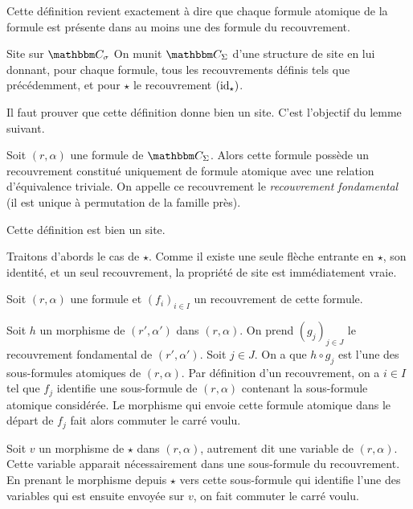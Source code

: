 Cette définition revient exactement à dire que chaque formule atomique de la formule est
présente dans au moins une des formule du recouvrement.

\begin{defi}{Site sur $\C_\sigma$}
    On munit $\C_\Sigma$ d'une structure de site en lui donnant, pour chaque formule,
    tous les recouvrements définis tels que précédemment, et pour $\star$ le recouvrement
    $(\operatorname{id}_\star)$.
\end{defi}

Il faut prouver que cette définition donne bien un site. C'est l'objectif du
lemme suivant.

\begin{rem}
    Soit $(r,\alpha)$ une formule de $\C_\Sigma$. Alors cette formule possède un
    recouvrement constitué uniquement de formule atomique avec une relation d'équivalence
    triviale. On appelle ce recouvrement le \emph{recouvrement fondamental}
    (il est unique à permutation de la famille près).
\end{rem}

\begin{lem}
    Cette définition est bien un site.
\end{lem}

\begin{pv}
    Traitons d'abords le cas de $\star$. Comme il existe une seule flèche
    entrante en $\star$, son identité, et un seul recouvrement, la propriété de
    site est immédiatement vraie.

    Soit $(r,\alpha)$ une formule et $(f_i)_{i\in I}$ un recouvrement de cette formule.
    
    Soit $h$ un morphisme de $(r', \alpha')$ dans $(r,\alpha)$. On prend
    $(g_j)_{j\in J}$ le recouvrement fondamental de $(r', \alpha')$. Soit $j\in
    J$. On a que $h\circ g_j$ est l'une des sous-formules atomiques de
    $(r,\alpha)$. Par définition d'un recouvrement, on a $i\in I$ tel que $f_j$
    identifie une sous-formule de $(r,\alpha)$ contenant la sous-formule
    atomique considérée. Le morphisme qui envoie cette formule atomique dans le
    départ de $f_j$ fait alors commuter le carré voulu.

    Soit $v$ un morphisme de $\star$ dans $(r,\alpha)$, autrement dit une
    variable de $(r,\alpha)$.  Cette variable apparait nécessairement dans une
    sous-formule du recouvrement. En prenant le morphisme depuis $\star$ vers
    cette sous-formule qui identifie l'une des variables qui est ensuite
    envoyée sur $v$, on fait commuter le carré voulu.
\end{pv}


